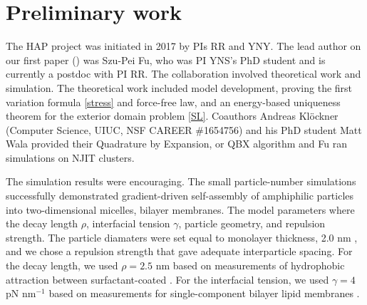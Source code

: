 \section{Preliminary work}
\label{sec:preliminary_work}
The HAP project was initiated in 2017 by PIs RR and YNY.
The lead author on our first paper (\cite{Fu2018_SIAM}) was Szu-Pei Fu,
who was PI YNS's PhD student and is currently a postdoc with PI RR.
The collaboration involved theoretical work and simulation. The theoretical
work included model development, proving the first variation formula
\eqref{stress} and force-free law, and an energy-based  uniqueness
theorem for the exterior domain problem \eqref{SL}.
Coauthors Andreas Kl\"ockner (Computer Science, UIUC, NSF CAREER \#1654756)
and his PhD student Matt Wala provided their Quadrature by Expansion, or QBX
algorithm and Fu ran simulations on NJIT clusters.   

The simulation results were encouraging. The small particle-number
simulations successfully demonstrated gradient-driven self-assembly of amphiphilic
particles into two-dimensional micelles, bilayer membranes. The model parameters
where the decay length $\rho$, interfacial tension $\gamma$, particle geometry, and
repulsion strength. The particle diamaters were set equal to monolayer thickness, 
2.0 nm \cite{Boal}, and we chose a repulsion strength that gave adequate interparticle 
spacing. For the decay length, we used $\rho = 2.5$ nm based on measurements of hydrophobic
attraction between surfactant-coated \cite{Eriksson1989,Lin2005,Parsegian,Israelachvili80}.
For the interfacial tension, we used $\gamma = 4$ pN nm$^{-1}$
based on measurements for single-component bilayer lipid membranes
\cite{GarciaSaez, KUZMIN2005, Petelska2012, Jackson2016}.

